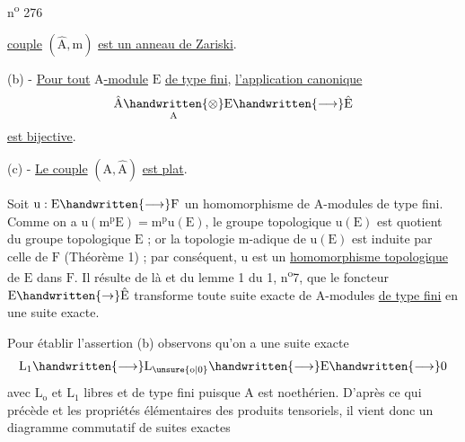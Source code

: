 
n\textsuperscript{o} 276

\uline{couple} $(\hat{\mathrm A},\mathrm m)$ \uline{est un anneau de Zariski}.

(b) - \uline{Pour tout} $\mathrm A$\uline{-module} $\mathrm E$ \uline{de type fini}, \uline{l'application canonique}
\[
\hat{\mathrm A}\underset{\mathrm A}{\handwritten{\otimes}}\mathrm E\handwritten{\longrightarrow}\hat{\mathrm E}
\]
\uline{est bijective}.

(c) - \uline{Le couple} $(\mathrm A,\hat{\mathrm A})$ \uline{est plat}.

Soit $\mathrm u:\mathrm E\handwritten{\longrightarrow}\mathrm F$ un homomorphisme de $\mathrm A$-modules de type fini. Comme on a $\mathrm u(\mathrm m^{\mathrm p}\mathrm E)=\mathrm m^{\mathrm p}\mathrm u(\mathrm E)$, le groupe topologique $\mathrm u(\mathrm E)$ est quotient du groupe topologique $\mathrm E$ ; or la topologie $\mathrm m$-adique de $\mathrm u(\mathrm E)$ est induite par celle de $\mathrm F$ (Théorème 1) ; par conséquent, $\mathrm u$ est un \uline{homomorphisme topologique} de $\mathrm E$ dans $\mathrm F$. Il résulte de là et du lemme 1 du \handwritten{\S}1, n\textsuperscript{o}7, que le foncteur $\mathrm E\handwritten{\to}\hat{\mathrm E}$ transforme toute suite exacte de $\mathrm A$-modules \uline{de type fini} en une suite exacte.

Pour établir l'assertion (b) observons qu'on a une suite exacte
\[
\mathrm L_1\handwritten{\longrightarrow}\mathrm L_{\unsure{\mathrm o|0}}\handwritten{\longrightarrow}\mathrm E\handwritten{\longrightarrow}0
\]
avec $\mathrm L_{\mathrm o}$ et $\mathrm L_1$ libres et de type fini puisque $\mathrm A$ est noethérien. D'après ce qui précède et les propriétés élémentaires des produits tensoriels, il vient donc un diagramme commutatif de suites exactes


